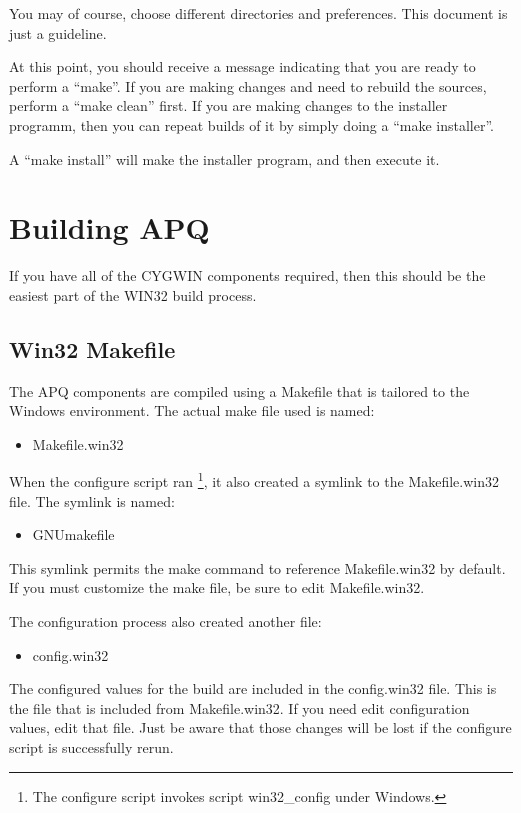 \documentclass[english]{report}
\begin{document}
You may of course, choose different directories and preferences. This
document is just a guideline. 

At this point, you should receive a message indicating that you are
ready to perform a {}``make''. If you are making changes and need
to rebuild the sources, perform a {}``make clean'' first. If you
are making changes to the installer programm, then you can repeat
builds of it by simply doing a {}``make installer''.

A {}``make install'' will make the installer program, and then execute
it.


\section{Building APQ}

If you have all of the CYGWIN components required, then this should
be the easiest part of the WIN32 build process.


\subsection{Win32 Makefile}

The APQ components are compiled using a Makefile that is tailored
to the Windows environment. The actual make file used is named:

\begin{itemize}
\item Makefile.win32
\end{itemize}
When the configure script ran%
\footnote{The configure script invokes script win32\_config under Windows.%
}, it also created a symlink to the Makefile.win32 file. The symlink
is named:

\begin{itemize}
\item GNUmakefile
\end{itemize}
This symlink permits the make command to reference Makefile.win32
by default. If you must customize the make file, be sure to edit Makefile.win32.

The configuration process also created another file:

\begin{itemize}
\item config.win32
\end{itemize}
The configured values for the build are included in the config.win32
file. This is the file that is included from Makefile.win32. If you
need edit configuration values, edit that file. Just be aware that
those changes will be lost if the configure script is successfully
rerun.
\end{document}

